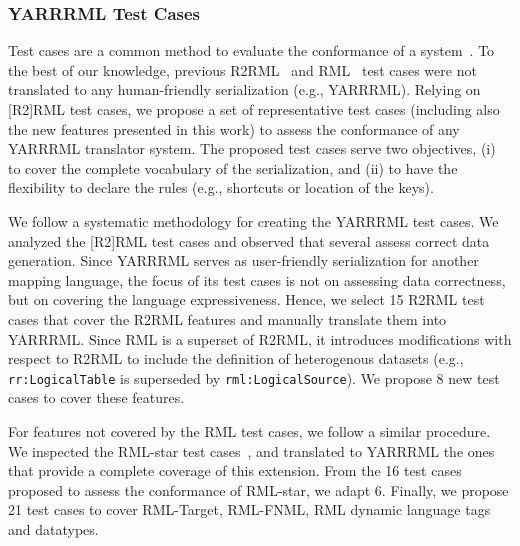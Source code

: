 \subsubsection{YARRRML Test Cases} %
Test cases are a common method to evaluate the conformance of a system~\parencite{arenas2023morphstar,heyvaert2019conformance}. 
To the best of our knowledge, previous R2RML~\parencite{boris2012r2rml} and RML~\parencite{heyvaert2019conformance} test cases were not translated to any human-friendly serialization (e.g., YARRRML).
Relying on [R2]RML test cases, we propose a set of representative test cases (including also the new features presented in this work) to assess the conformance of any YARRRML translator system.
The proposed test cases serve two objectives, (i) to cover the complete vocabulary of the serialization, and (ii) to have the flexibility to declare the rules (e.g., shortcuts or location of the keys). 

We follow a systematic methodology for creating the YARRRML test cases. 
We analyzed the [R2]RML test cases and observed that several assess correct data generation.
Since YARRRML serves as user-friendly serialization for another mapping language, the focus of its test cases is not on assessing data correctness, but on covering the language expressiveness.
Hence, we select 15 R2RML test cases that cover the R2RML features and manually translate them into YARRRML. 
Since RML is a superset of R2RML, it introduces modifications with respect to R2RML to include the definition of heterogenous datasets (e.g., \texttt{rr:LogicalTable} is superseded by \texttt{rml:LogicalSource}). %
We propose 8 new test cases to cover these features. 

For features not covered by the RML test cases, we follow a similar procedure. 
We inspected the RML-star test cases~\parencite{david_chaves_2022_6518802}, and translated to YARRRML the ones that provide a complete coverage of this extension. 
From the 16 test cases proposed to assess the conformance of RML-star, we adapt 6. 
Finally, we propose 21 test cases to cover RML-Target, RML-FNML, RML dynamic language tags and datatypes. 

